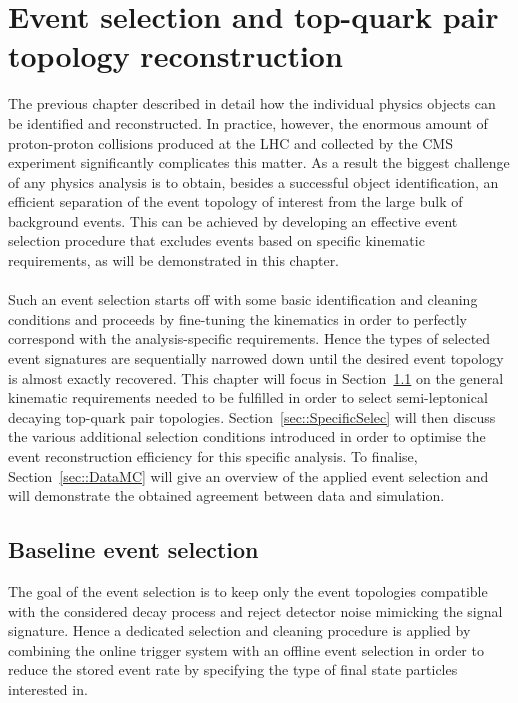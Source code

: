 \chapter{Event selection and top-quark pair topology reconstruction} \label{chp:labelTitle}

The previous chapter described in detail how the individual physics objects can be identified and reconstructed. In practice, however, the enormous amount of proton-proton collisions produced at the LHC and collected by the CMS experiment significantly complicates this matter.
As a result the biggest challenge of any physics analysis is to obtain, besides a successful object identification, an efficient separation of the event topology of interest from the large bulk of background events.
This can be achieved by developing an effective event selection procedure that excludes events based on specific kinematic requirements, as will be demonstrated in this chapter.
\\
\\
Such an event selection starts off with some basic identification and cleaning conditions and proceeds by fine-tuning the kinematics in order to perfectly correspond with the analysis-specific requirements. Hence the types of selected event signatures are sequentially narrowed down until the desired event topology is almost exactly recovered. This chapter will focus in Section~\ref{sec::MainSelec} on the general kinematic requirements needed to be fulfilled in order to select semi-leptonical decaying top-quark pair topologies. Section~\ref{sec::SpecificSelec} will then discuss the various additional selection conditions introduced in order to optimise the event reconstruction efficiency for this specific analysis.
To finalise, Section~\ref{sec::DataMC} will give an overview of the applied event selection and will demonstrate the obtained agreement between data and simulation.

\section{Baseline event selection}\label{sec::MainSelec}
The goal of the event selection is to keep only the event topologies compatible with the considered decay process and reject detector noise mimicking the signal signature. 
Hence a dedicated selection and cleaning procedure is applied by combining the online trigger system with an offline event selection in order to reduce the stored event rate by specifying the type of final state particles interested in.

